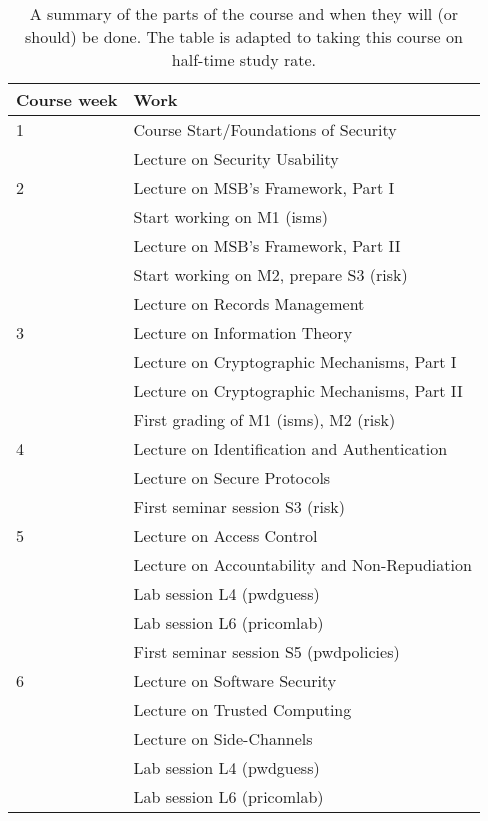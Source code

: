 \begin{table}
	\centering
  \caption{%
    A summary of the parts of the course and when they will (or should) be 
    done.
    The table is adapted to taking this course on half-time study rate.
  }\label{Schedule}
  \begin{tabular}{lp{9cm}}
    \toprule
    \textbf{Course week}	& \textbf{Work} \\
    \midrule
    1
      & Course Start/Foundations of Security\\
      & Lecture on Security Usability\\
    \midrule
    2
      & Lecture on MSB's Framework, Part I\\
      & Start working on M1 (isms)\\
      & Lecture on MSB's Framework, Part II\\
      & Start working on M2, prepare S3 (risk)\\
      & Lecture on Records Management\\
    \midrule
    3
      & Lecture on Information Theory\\
      & Lecture on Cryptographic Mechanisms, Part I\\
      & Lecture on Cryptographic Mechanisms, Part II\\
      & First grading of M1 (isms), M2 (risk)\\
    \midrule
    4
      & Lecture on Identification and Authentication\\
      & Lecture on Secure Protocols\\
      & First seminar session S3 (risk)\\
    \midrule
    5
      & Lecture on Access Control\\
      & Lecture on Accountability and Non-Repudiation\\
      & Lab session L4 (pwdguess)\\
      & Lab session L6 (pricomlab)\\
      & First seminar session S5 (pwdpolicies)\\
    \midrule
    6
      & Lecture on Software Security\\
      & Lecture on Trusted Computing\\
      & Lecture on Side-Channels\\
      & Lab session L4 (pwdguess)\\
      & Lab session L6 (pricomlab)\\

\end{tabular}
\end{table}

